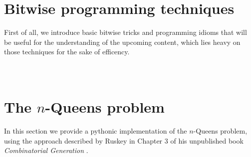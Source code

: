 
\section*{Bitwise programming techniques}

First of all, we introduce basic bitwise tricks and programming idioms that
will be useful for the understanding of the upcoming content, which lies heavy
on those techniques for the sake of efficency.

\inputminted[fontsize=\small,stripnl=false, firstline=193,lastline=206]{python}{backtracking/bits.py}
\inputminted[fontsize=\small,stripnl=false, firstline=208,lastline=221]{python}{backtracking/bits.py}
\inputminted[fontsize=\small,stripnl=false, firstline=268,lastline=280]{python}{backtracking/bits.py}

\section{The $n$-Queens problem}

In this section we provide a pythonic implementation of the $n$-Queens problem,
using the approach described by Ruskey 
in Chapter 3 of his unpublished book
\textit{Combinatorial Generation}
.

